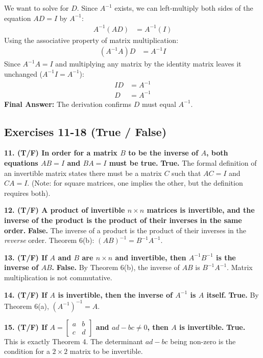 \documentclass[11pt]{article}
\begin{document}
We want to solve for $D$. Since $A^{-1}$ exists, we can left-multiply both sides of the equation $AD = I$ by $A^{-1}$:
\begin{align*}
    A^{-1}(AD) &= A^{-1}(I)
\end{align*}
Using the associative property of matrix multiplication:
\begin{align*}
    (A^{-1}A)D &= A^{-1}I
\end{align*}
Since $A^{-1}A = I$ and multiplying any matrix by the identity matrix leaves it unchanged ($A^{-1}I = A^{-1}$):
\begin{align*}
    I D &= A^{-1} \\
    D &= A^{-1}
\end{align*}
\textbf{Final Answer:} The derivation confirms $D$ must equal $A^{-1}$.

\subsection{Exercises 11-18 (True / False)}
\textbf{11. (T/F) In order for a matrix $B$ to be the inverse of $A$, both equations $AB = I$ and $BA = I$ must be true.}
\textbf{True.} The formal definition of an invertible matrix states there must be a matrix $C$ such that $AC = I$ and $CA = I$. (Note: for square matrices, one implies the other, but the definition requires both).

\textbf{12. (T/F) A product of invertible $n \times n$ matrices is invertible, and the inverse of the product is the product of their inverses in the same order.}
\textbf{False.} The inverse of a product is the product of their inverses in the \textit{reverse} order. Theorem 6(b): $(AB)^{-1} = B^{-1}A^{-1}$.

\textbf{13. (T/F) If $A$ and $B$ are $n \times n$ and invertible, then $A^{-1}B^{-1}$ is the inverse of $AB$.}
\textbf{False.} By Theorem 6(b), the inverse of $AB$ is $B^{-1}A^{-1}$. Matrix multiplication is not commutative.

\textbf{14. (T/F) If $A$ is invertible, then the inverse of $A^{-1}$ is $A$ itself.}
\textbf{True.} By Theorem 6(a), $(A^{-1})^{-1} = A$.

\textbf{15. (T/F) If $A = \begin{bmatrix} a & b \\ c & d \end{bmatrix}$ and $ad - bc \neq 0$, then $A$ is invertible.}
\textbf{True.} This is exactly Theorem 4. The determinant $ad - bc$ being non-zero is the condition for a $2 \times 2$ matrix to be invertible.
\end{document}
